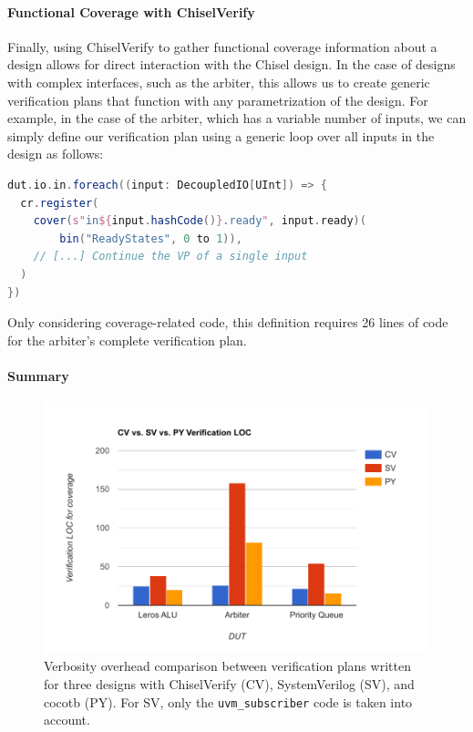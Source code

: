 \documentclass[conference]{IEEEtran}
\begin{document}
\paragraph{Functional Coverage with ChiselVerify} Finally, using ChiselVerify to gather functional coverage information about a design allows for direct interaction with the Chisel design.
In the case of designs with complex interfaces, such as the arbiter, this allows us to create generic verification plans that function with any parametrization of the design.
For example, in the case of the arbiter, which has a variable number of inputs, we can simply define our verification plan using a generic loop over all inputs in the design as follows:
 \begin{lstlisting}[language=scala]
dut.io.in.foreach((input: DecoupledIO[UInt]) => {
  cr.register(
    cover(s"in${input.hashCode()}.ready", input.ready)(
        bin("ReadyStates", 0 to 1)),
    // [...] Continue the VP of a single input
  )
})
 \end{lstlisting}
Only considering coverage-related code, this definition requires 26 lines of code for the arbiter's complete verification plan.

\paragraph{Summary}
\begin{figure}[h]
  \centering
  \includegraphics[trim=0.7cm 0.5cm 1cm 1cm, clip, width=.9\linewidth]{svcvpycomp.pdf}
  \caption{Verbosity overhead comparison between verification plans written for three designs with ChiselVerify (CV), SystemVerilog (SV), and cocotb (PY). For SV, only the \texttt{uvm\_subscriber} code is taken into account. }
  \label{fig:cvsvpycomp}
  \end{figure}
  
\end{document}
